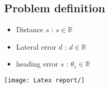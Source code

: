\subsection{Problem definition}
\begin{itemize}
    \item Distance $s$ : $s \in \mathbb{R}$
    \item Lateral error $d$ : $d \in \mathbb{R}$
    \item heading error $s$ : $\theta_e \in \mathbb{R}$
\end{itemize}

\texttt{[image: Latex report/]}